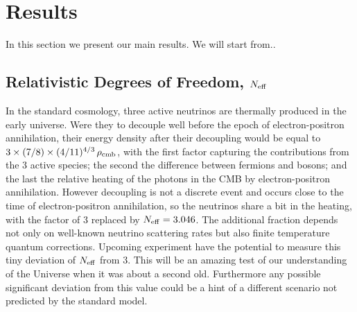 \documentclass[aps,prd,reprint,superscriptaddress]{revtex4-1}
\begin{document}
\section{Results \label{sec:results}}
In this section we present our main results. We will start from.. 

\subsection{Relativistic Degrees of Freedom, $N_{\rm eff}$}

In the standard cosmology, three active neutrinos are thermally produced in the early universe. Were they to decouple well before the epoch of electron-positron annihilation, their energy density after their decoupling would be equal to $3\times (7/8)\times (4/11)^{4/3}\,\rho_{\rm cmb}$, with the first factor capturing the contributions from the 3 active species; the second the difference between fermions and bosons; and the last the relative heating of the photons in the CMB by electron-positron annihilation. However decoupling is not a discrete event and occurs close to the time of electron-positron annihilation, so the neutrinos share a bit in the heating, with the factor of 3 replaced by $N_{\rm eff}=3.046$. The additional fraction depends not only on well-known neutrino scattering rates but also finite temperature quantum corrections. 
Upcoming experiment have the potential to measure this tiny deviation of $N_{\rm eff}$ from 3. This will be an amazing test of our understanding of the Universe when it was about a second old.
Furthermore any possible significant deviation from this value could be a hint of a different scenario not predicted by the standard model. 
\end{document}
